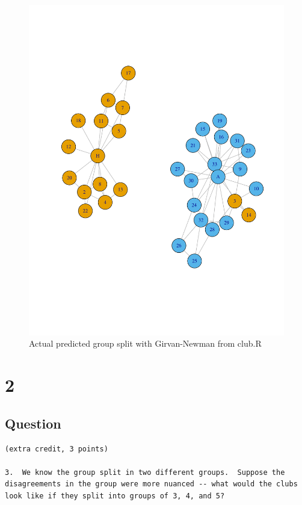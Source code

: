 \documentclass[letterpaper,11pt]{article}
\begin{document}
\begin{figure}[h]
\centering
\includegraphics[scale=0.6]{predictedSplit2.pdf}
\caption{Actual predicted group split with Girvan-Newman from club.R}
\label{fig:q1outcome}
\end{figure}

\clearpage


\section*{2}

\subsection*{Question}

\begin{verbatim}
(extra credit, 3 points)

3.  We know the group split in two different groups.  Suppose the
disagreements in the group were more nuanced -- what would the clubs
look like if they split into groups of 3, 4, and 5?
\end{verbatim}
\end{document}
